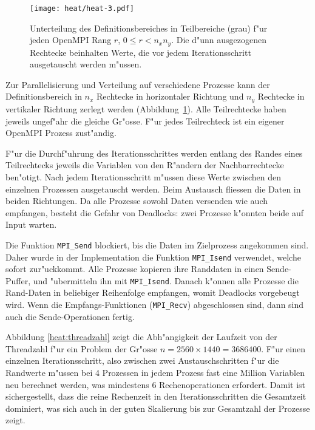 \begin{figure}
\begin{center}
\texttt{[image: heat/heat-3.pdf]}
\end{center}
\caption{Unterteilung des Definitionsbereiches in Teilbereiche (grau)
f"ur jeden OpenMPI Rang $r$, $0\le r<n_xn_y$.
Die d"unn ausgezogenen Rechtecke beinhalten Werte, die vor jedem 
Iterationsschritt ausgetauscht werden m"ussen.
\label{heat:domainpartition}}
\end{figure}

Zur Parallelisierung und Verteilung auf verschiedene Prozesse kann
der Definitionsbereich in $n_x$ Rechtecke in horizontaler Richtung
und $n_y$ Rechtecke in vertikaler Richtung zerlegt werden
(Abbildung~\ref{heat:domainpartition}).
Alle Teilrechtecke haben jeweils ungef"ahr die gleiche Gr"osse.
F"ur jedes Teilrechteck ist ein eigener OpenMPI Prozess zust"andig.

F"ur die Durchf"uhrung des Iterationsschrittes werden entlang des Randes
eines Teilrechtecks jeweils
die Variablen von den R"andern der Nachbarrechtecke ben"otigt.
Nach jedem Iterationsschritt m"ussen diese Werte zwischen den einzelnen
Prozessen ausgetauscht werden.
Beim Austausch fliessen die Daten in beiden Richtungen.
Da alle Prozesse sowohl Daten versenden wie auch empfangen, besteht
die Gefahr von Deadlocks: zwei Prozesse k"onnten beide auf Input warten.

Die Funktion
\verb+MPI_Send+ blockiert, bis die Daten im Zielprozess angekommen sind.
Daher wurde in der Implementation die Funktion \verb+MPI_Isend+ verwendet,
welche sofort zur"uckkommt. Alle Prozesse kopieren ihre Randdaten in
einen Sende-Puffer, und "ubermitteln ihn mit \verb+MPI_Isend+.
Danach k"onnen alle Prozesse die Rand-Daten in beliebiger Reihenfolge
empfangen, womit Deadlocks vorgebeugt wird.
Wenn die Empfangs-Funktionen (\verb+MPI_Recv+) abgeschlossen sind,
dann sind auch die Sende-Operationen fertig.

Abbildung \ref{heat:threadzahl} zeigt die Abh"angigkeit der Laufzeit von der
Threadzahl f"ur ein Problem der Gr"osse $n=2560 \times 1440=3686400$.
F"ur einen einzelnen Iterationsschritt, also zwischen zwei Austauschschritten
f"ur die Randwerte m"ussen bei 4 Prozessen in jedem Prozess fast eine Million
Variablen neu berechnet werden, was mindestens 6 Rechenoperationen erfordert.
Damit ist sichergestellt, dass die reine Rechenzeit in den Iterationsschritten
die Gesamtzeit dominiert, was sich auch in der guten Skalierung bis
zur Gesamtzahl der Prozesse zeigt.


